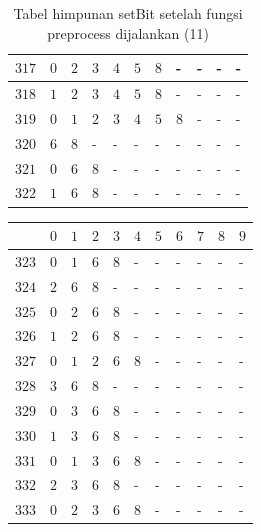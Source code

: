 \begin{appendices}
\begin{table}[H]
\begin{tabular} {|l|l|l|l|l|l|l|l|l|l|l|}
  		$ 317 $ & $ 0 $ &$ 2 $ &$ 3 $ &$ 4 $ &$ 5 $ &$ 8 $ & - &  - &  - &  -   \\ \hline
  		$ 318 $ & $ 1 $ &$ 2 $ &$ 3 $ &$ 4 $ &$ 5 $ &$ 8 $ & - &  - &  - &  -   \\ \hline
  		$ 319 $ & $ 0 $ &$ 1 $ &$ 2 $ &$ 3 $ &$ 4 $ &$ 5 $ &$ 8 $ & - &  - &  -   \\ \hline
  		$ 320 $ & $ 6 $ &$ 8 $ & - &  - &  - &  - &  - &  - &  - &  -   \\ \hline
  		$ 321 $ & $ 0 $ &$ 6 $ &$ 8 $ & - &  - &  - &  - &  - &  - &  -   \\ \hline
  		$ 322 $ & $ 1 $ &$ 6 $ &$ 8 $ & - &  - &  - &  - &  - &  - &  -   \\ \hline
  	\end{tabular}\caption{Tabel himpunan setBit setelah fungsi preprocess dijalankan (11)}
  	\label{tab:setbit_11}
  \end{table}
  \begin{table}[H]
  	\centering
  	\begin{tabular} {|l|l|l|l|l|l|l|l|l|l|l|} \hline
  		\backslashbox{$Num$}{$index$} & $ 0 $ & $ 1 $ & $ 2 $ & $ 3 $ & $ 4 $ & $ 5 $ & $ 6 $ & $ 7 $ & $ 8 $ & $ 9 $ \\ \hline
  		$ 323 $ & $ 0 $ &$ 1 $ &$ 6 $ &$ 8 $ & - &  - &  - &  - &  - &  -   \\ \hline
  		$ 324 $ & $ 2 $ &$ 6 $ &$ 8 $ & - &  - &  - &  - &  - &  - &  -   \\ \hline
  		$ 325 $ & $ 0 $ &$ 2 $ &$ 6 $ &$ 8 $ & - &  - &  - &  - &  - &  -   \\ \hline
  		$ 326 $ & $ 1 $ &$ 2 $ &$ 6 $ &$ 8 $ & - &  - &  - &  - &  - &  -   \\ \hline
  		$ 327 $ & $ 0 $ &$ 1 $ &$ 2 $ &$ 6 $ &$ 8 $ & - &  - &  - &  - &  -   \\ \hline
  		$ 328 $ & $ 3 $ &$ 6 $ &$ 8 $ & - &  - &  - &  - &  - &  - &  -   \\ \hline
  		$ 329 $ & $ 0 $ &$ 3 $ &$ 6 $ &$ 8 $ & - &  - &  - &  - &  - &  -   \\ \hline
  		$ 330 $ & $ 1 $ &$ 3 $ &$ 6 $ &$ 8 $ & - &  - &  - &  - &  - &  -   \\ \hline
  		$ 331 $ & $ 0 $ &$ 1 $ &$ 3 $ &$ 6 $ &$ 8 $ & - &  - &  - &  - &  -   \\ \hline
  		$ 332 $ & $ 2 $ &$ 3 $ &$ 6 $ &$ 8 $ & - &  - &  - &  - &  - &  -   \\ \hline
  		$ 333 $ & $ 0 $ &$ 2 $ &$ 3 $ &$ 6 $ &$ 8 $ & - &  - &  - &  - &  -   \\ \hline

\end{tabular}
\end{table}
\end{appendices}
